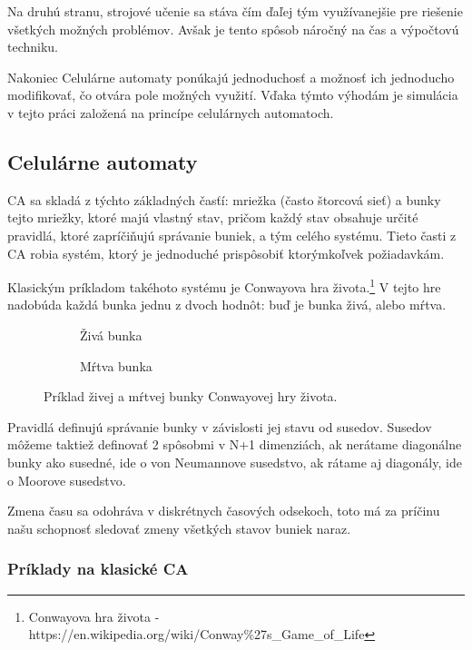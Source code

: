 \documentclass[12pt]{article}
\begin{document}
Na druhú stranu, strojové učenie sa stáva čím ďaľej tým využívanejšie pre
riešenie všetkých možných problémov. Avšak je tento spôsob náročný na čas
a výpočtovú techniku.

Nakoniec Celulárne automaty ponúkajú jednoduchosť a možnosť ich jednoducho
modifikovať, čo otvára pole možných využití. Vďaka týmto výhodám je simulácia
v tejto práci založená na princípe celulárnych automatoch.

\newpage
\subsection{Celulárne automaty}

CA sa skladá z týchto základných časťí: mriežka (často štorcová sieť)
a bunky tejto mriežky, ktoré majú vlastný stav, pričom každý stav obsahuje
určité pravidlá, ktoré zapríčiňujú správanie buniek, a tým celého systému.
Tieto časti z CA robia systém, ktorý je jednoduché prispôsobiť ktorýmkoľvek
požiadavkám.

Klasickým príkladom takéhoto systému je Conwayova hra života.\footnote
{Conwayova hra života - https://en.wikipedia.org/wiki/Conway\%27s\_Game\_of\_Life}
V tejto hre nadobúda každá bunka jednu z dvoch hodnôt: buď je bunka živá, alebo
mŕtva.

\begin{figure}[h]
	\centering
	\begin{subfigure}[t]{0.48\textwidth}
		\centering
		
		\caption*{Živá bunka}
	\end{subfigure}
	\begin{subfigure}[t]{0.48\textwidth}
		\centering
		
		\caption*{Mŕtva bunka}
	\end{subfigure}
	\caption{Príklad živej a mŕtvej bunky Conwayovej hry života.}
\end{figure}

Pravidlá definujú správanie bunky v závislosti jej stavu od susedov. Susedov
môžeme taktiež definovať 2 spôsobmi v N+1 dimenziách, ak nerátame diagonálne
bunky ako susedné, ide o von Neumannove susedstvo, ak rátame aj diagonály,
ide o Moorove susedstvo. %

Zmena času sa odohráva v diskrétnych časových odsekoch, toto má za príčinu
našu schopnosť sledovať zmeny všetkých stavov buniek naraz.

\subsubsection{Príklady na klasické CA}
\end{document}
